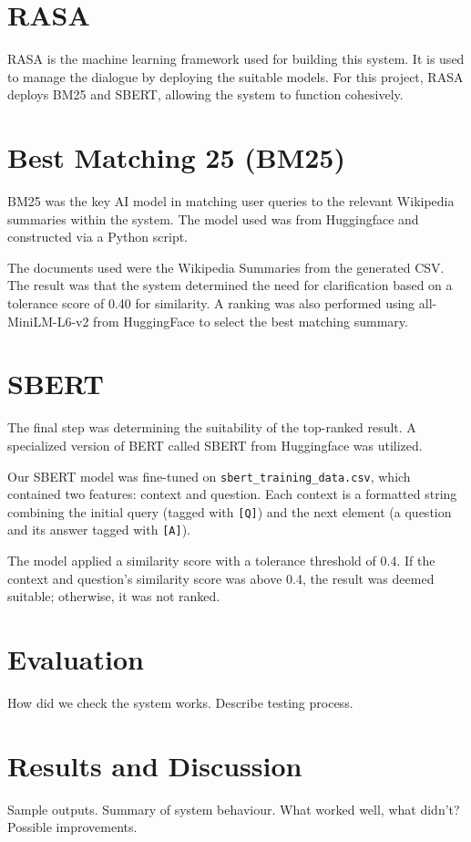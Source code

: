\documentclass[11pt]{article}
\begin{document}
\section{RASA}
RASA is the machine learning framework used for building this system. It is used to manage the dialogue by deploying the suitable models. For this project, RASA deploys BM25 and SBERT, allowing the system to function cohesively.

\section{Best Matching 25 (BM25)}
BM25 was the key AI model in matching user queries to the relevant Wikipedia summaries within the system. The model used was from Huggingface and constructed via a Python script. 

The documents used were the Wikipedia Summaries from the generated CSV. The result was that the system determined the need for clarification based on a tolerance score of 0.40 for similarity. A ranking was also performed using all-MiniLM-L6-v2 from HuggingFace to select the best matching summary.


\section{SBERT}
The final step was determining the suitability of the top-ranked result. A specialized version of BERT called SBERT from Huggingface was utilized.

Our SBERT model was fine-tuned on \texttt{sbert\_training\_data.csv}, which contained two features: context and question. Each context is a formatted string combining the initial query (tagged with \texttt{[Q]}) and the next element (a question and its answer tagged with \texttt{[A]}).

The model applied a similarity score with a tolerance threshold of 0.4. If the context and question's similarity score was above 0.4, the result was deemed suitable; otherwise, it was not ranked.


\cite{Aliannejadi2019}

\section{Evaluation}
How did we check the system works.
Describe testing process.

\section{Results and Discussion}
Sample outputs.
Summary of system behaviour.
What worked well, what didn't?
Possible improvements.
\end{document}
